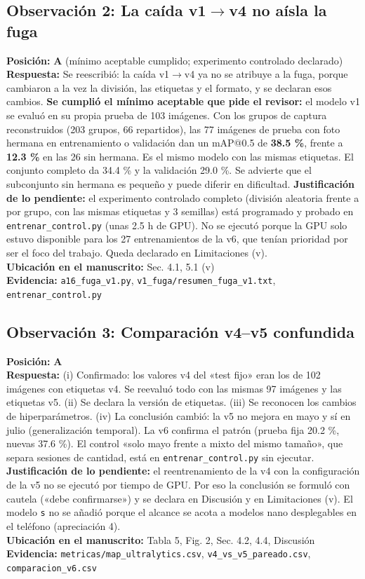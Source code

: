 \documentclass[11pt,a4paper]{article}
\begin{document}
\subsection*{Observación 2: La caída v1$\rightarrow$v4 no aísla la fuga}
\noindent\textbf{Posición:} \textbf{A} (mínimo aceptable cumplido; experimento controlado declarado)\\
\textbf{Respuesta:} Se reescribió: la caída v1$\rightarrow$v4 ya no se atribuye a la fuga, porque cambiaron a la vez la división, las etiquetas y el formato, y se declaran esos cambios. \textbf{Se cumplió el mínimo aceptable que pide el revisor:} el modelo v1 se evaluó en su propia prueba de 103 imágenes. Con los grupos de captura reconstruidos (203 grupos, 66 repartidos), las 77 imágenes de prueba con foto hermana en entrenamiento o validación dan un mAP@0.5 de \textbf{38.5 \%}, frente a \textbf{12.3 \%} en las 26 sin hermana. Es el mismo modelo con las mismas etiquetas. El conjunto completo da 34.4 \% y la validación 29.0 \%. Se advierte que el subconjunto sin hermana es pequeño y puede diferir en dificultad. \textbf{Justificación de lo pendiente:} el experimento controlado completo (división aleatoria frente a por grupo, con las mismas etiquetas y 3 semillas) está programado y probado en \texttt{entrenar\_control.py} (unas 2.5 h de GPU). No se ejecutó porque la GPU solo estuvo disponible para los 27 entrenamientos de la v6, que tenían prioridad por ser el foco del trabajo. Queda declarado en Limitaciones (v).\\
\textbf{Ubicación en el manuscrito:} Sec. 4.1, 5.1 (v)\\
\textbf{Evidencia:} \texttt{a16\_fuga\_v1.py}, \texttt{v1\_fuga/resumen\_fuga\_v1.txt}, \texttt{entrenar\_control.py}

\subsection*{Observación 3: Comparación v4–v5 confundida}
\noindent\textbf{Posición:} \textbf{A}\\
\textbf{Respuesta:} (i) Confirmado: los valores v4 del «test fijo» eran los de 102 imágenes con etiquetas v4. Se reevaluó todo con las mismas 97 imágenes y las etiquetas v5. (ii) Se declara la versión de etiquetas. (iii) Se reconocen los cambios de hiperparámetros. (iv) La conclusión cambió: la v5 no mejora en mayo y sí en julio (generalización temporal). La v6 confirma el patrón (prueba fija 20.2 \%, nuevas 37.6 \%). El control «solo mayo frente a mixto del mismo tamaño», que separa sesiones de cantidad, está en \texttt{entrenar\_control.py} sin ejecutar. \textbf{Justificación de lo pendiente:} el reentrenamiento de la v4 con la configuración de la v5 no se ejecutó por tiempo de GPU. Por eso la conclusión se formuló con cautela («debe confirmarse») y se declara en Discusión y en Limitaciones (v). El modelo \texttt{s} no se añadió porque el alcance se acota a modelos nano desplegables en el teléfono (apreciación 4).\\
\textbf{Ubicación en el manuscrito:} Tabla 5, Fig. 2, Sec. 4.2, 4.4, Discusión\\
\textbf{Evidencia:} \texttt{metricas/map\_ultralytics.csv}, \texttt{v4\_vs\_v5\_pareado.csv}, \texttt{comparacion\_v6.csv}
\end{document}
